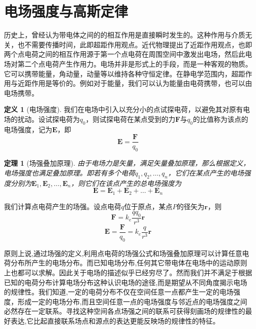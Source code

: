 \documentclass[12pt,a4paper,oneside]{report}
\newtheorem{theorem}{定理}[chapter]
\theoremstyle{definition}
\newtheorem{definition}{定义}[chapter]
\theoremstyle{remark}
\begin{document}
\section{电场强度与高斯定律}

历史上，曾经认为带电体之间的的相互作用是直接瞬时发生的。这种作用与介质无关，也不需要传播时间，此即超距作用观点。近代物理提出了近距作用观点，也即两个点电荷之间的相互作用源于第一个点电荷在周围空间中激发出电场，然后此电场对第二个点电荷产生作用力。电场并非是形式上的手段，而是一种客观的物质。它可以携带能量，角动量，动量等以维持各种守恒定律。在静电学范围内，超距作用与近距作用是等价的。例如对于能量，我们可以认为能量由电荷携带，也可以由电场携带。

\begin{definition}[电场强度]
  我们在电场中引入以充分小的点试探电荷，以避免其对原有电场的扰动。设试探电荷为$q_0$，则试探电荷在某点受到的力$\mathbf{F}$与$q_0$的比值称为该点的电场强度，记为$\mathbf{E}$，即
  \[
  \mathbf{E} = \frac{\mathbf{F}}{q_0}
  \]
\end{definition}
\begin{theorem}[场强叠加原理]
  由于电场力是矢量，满足矢量叠加原理，那么根据定义，电场强度也满足叠加原理。即若有多个电荷$q_1,q_2,\ldots,q_n$，它们在某点产生的电场强度分别为$\mathbf{E}_1,\mathbf{E}_2,\ldots,\mathbf{E}_n$，则它们在该点产生的总电场强度为
  \[
  \mathbf{E} = \mathbf{E}_1 + \mathbf{E}_2 + \ldots + \mathbf{E}_n
  \]
\end{theorem}

我们计算点电荷产生的场强。设点电荷$q$位于原点，某点$P$的径矢为$\mathbf{r}$，则
\[
\mathbf{F} = k_e \frac{q q_0}{r^3}\mathbf{r}
\]
\[
\mathbf{E} = \frac{\mathbf{F}}{q_0} = k_e \frac{q}{r^3}\mathbf{r}
\]

原则上说,通过场强的定义,利用点电荷的场强公式和场强叠加原理可以计算任意电荷分布所产生的电场分布。而已知电场分布,任何其它带电体在电场中的运动原则上也都可以求解。因此关于电场的描述似乎已经穷尽了。然而我们并不满足于根据已知的电荷分布计算电场分布这种认识电场的途径,而是期望从不同角度揭示电场的规律性。我们知道,一定的电荷分布不仅在空间任意一点都产生一定的电场强度，形成一定的电场分布,而且空间任意一点的电场强度与邻近点的电场强度之间必然存在一定联系。寻找这种空间各点场强之间的联系可获得刻画场的规律性的最好表达,它比起直接联系场点和源点的表达更能反映场的规律性的特征。
\end{document}
